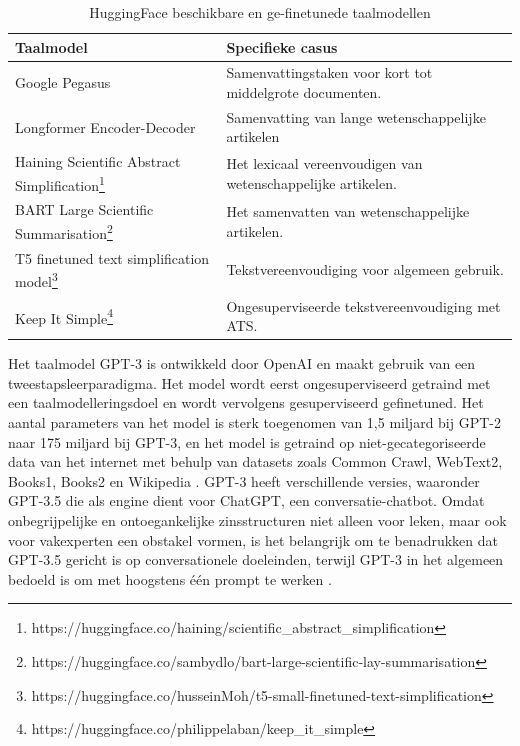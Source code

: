 \begin{center}
	\begin{table}[H]
	\begin{tabular}{ | m{4cm} | m{12cm} | } 
		\hline
		\textbf{Taalmodel} & Specifieke casus \\ \hline
		Google Pegasus & Samenvattingstaken voor kort tot middelgrote documenten. \\
		\hline
		Longformer Encoder-Decoder & Samenvatting van lange wetenschappelijke artikelen \\
		\hline
		Haining Scientific Abstract Simplification\footnote{https://huggingface.co/haining/scientific\_abstract\_simplification} & Het lexicaal vereenvoudigen van wetenschappelijke artikelen. \\
		\hline
		BART Large Scientific Summarisation\footnote{https://huggingface.co/sambydlo/bart-large-scientific-lay-summarisation} & Het samenvatten van wetenschappelijke artikelen. \\
		\hline
		T5 finetuned text simplification model\footnote{https://huggingface.co/husseinMoh/t5-small-finetuned-text-simplification} & Tekstvereenvoudiging voor algemeen gebruik. \\
		\hline
		Keep It Simple\footnote{https://huggingface.co/philippelaban/keep\_it\_simple} & Ongesuperviseerde tekstvereenvoudiging met ATS. \\
		\hline
	\end{tabular}
		\caption{HuggingFace beschikbare en ge-finetunede taalmodellen}
		\label{table:huggingface-models}
	\end{table}
\end{center}

\medspace

Het taalmodel GPT-3 is ontwikkeld door OpenAI en maakt gebruik van een tweestapsleerparadigma. Het model wordt eerst ongesuperviseerd getraind met een taalmodelleringsdoel en wordt vervolgens gesuperviseerd gefinetuned. Het aantal parameters van het model is sterk toegenomen van 1,5 miljard bij GPT-2 naar 175 miljard bij GPT-3, en het model is getraind op niet-gecategoriseerde data van het internet met behulp van datasets zoals Common Crawl, WebText2, Books1, Books2 en Wikipedia \autocite{Radford2019, Li2022}. GPT-3 heeft verschillende versies, waaronder GPT-3.5 die als engine dient voor ChatGPT, een conversatie-chatbot. Omdat onbegrijpelijke en ontoegankelijke zinsstructuren niet alleen voor leken, maar ook voor vakexperten een obstakel vormen, is het belangrijk om te benadrukken dat GPT-3.5 gericht is op conversationele doeleinden, terwijl GPT-3 in het algemeen bedoeld is om met hoogstens één prompt te werken \autocite{McNutt2014, Hubbard2017}.

